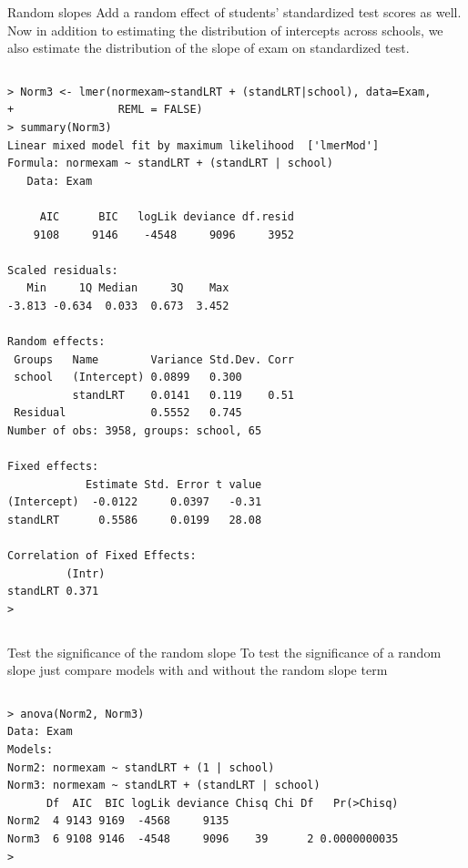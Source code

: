 \documentclass[table,smaller]{beamer}
\begin{document}
\begin{frame}[fragile,label=sec-5-6]{Random slopes}
 Add a random effect of students' standardized test scores as well. Now in addition to estimating the distribution of intercepts across schools, we also estimate the distribution of the slope of exam on standardized test.

\vspace{-.5em}
\begin{columns}
\begin{block}{}
\begin{verbatim}
> Norm3 <- lmer(normexam~standLRT + (standLRT|school), data=Exam,
+                REML = FALSE) 
> summary(Norm3) 
Linear mixed model fit by maximum likelihood  ['lmerMod']
Formula: normexam ~ standLRT + (standLRT | school)
   Data: Exam

     AIC      BIC   logLik deviance df.resid 
    9108     9146    -4548     9096     3952 

Scaled residuals: 
   Min     1Q Median     3Q    Max 
-3.813 -0.634  0.033  0.673  3.452 

Random effects:
 Groups   Name        Variance Std.Dev. Corr
 school   (Intercept) 0.0899   0.300        
          standLRT    0.0141   0.119    0.51
 Residual             0.5552   0.745        
Number of obs: 3958, groups: school, 65

Fixed effects:
            Estimate Std. Error t value
(Intercept)  -0.0122     0.0397   -0.31
standLRT      0.5586     0.0199   28.08

Correlation of Fixed Effects:
         (Intr)
standLRT 0.371 
>
\end{verbatim}
\end{block}
\end{columns}
\vspace{.5em}
\end{frame}

\begin{frame}[fragile,label=sec-5-7]{Test the significance of the random slope}
 To test the significance of a random slope just compare models with and without the random slope term 

\vspace{-.5em}
\begin{columns}
\begin{block}{}
\begin{verbatim}
> anova(Norm2, Norm3) 
Data: Exam
Models:
Norm2: normexam ~ standLRT + (1 | school)
Norm3: normexam ~ standLRT + (standLRT | school)
      Df  AIC  BIC logLik deviance Chisq Chi Df   Pr(>Chisq)
Norm2  4 9143 9169  -4568     9135                          
Norm3  6 9108 9146  -4548     9096    39      2 0.0000000035
>
\end{verbatim}
\end{block}
\end{columns}
\vspace{.5em}
\end{frame}
\end{document}
